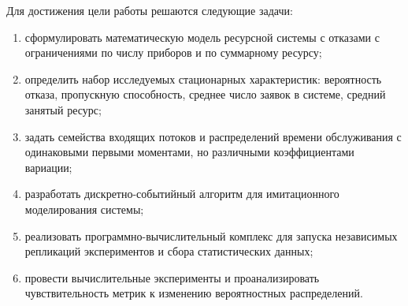 Для достижения цели работы решаются следующие задачи:
\begin{enumerate}
    \item сформулировать математическую модель ресурсной системы с отказами с ограничениями по числу приборов и по суммарному ресурсу;
    \item определить набор исследуемых стационарных характеристик: вероятность отказа, пропускную способность, среднее число заявок в системе, средний занятый ресурс;
    \item задать семейства входящих потоков и распределений времени обслуживания с одинаковыми первыми моментами, но различными коэффициентами вариации;
    \item разработать дискретно-событийный алгоритм для имитационного моделирования системы;
    \item реализовать программно-вычислительный комплекс для запуска независимых репликаций экспериментов и сбора статистических данных;
    \item провести вычислительные эксперименты и проанализировать чувствительность метрик к изменению вероятностных распределений.
\end{enumerate}


